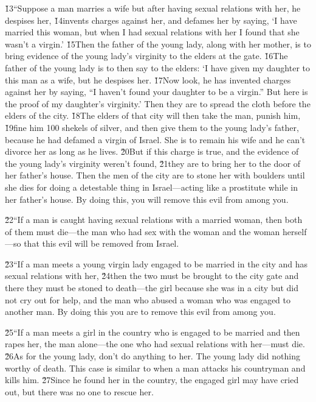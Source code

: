 \v{13}``Suppose a man marries a wife but after having sexual relations with her, he despises her, \v{14}invents charges against her, and defames her by saying, `I have married this woman, but when I had sexual relations with her I found that she wasn't a virgin.' \v{15}Then the father of the young lady, along with her mother, is to bring evidence of the young lady's virginity to the elders at the gate. \v{16}The father of the young lady is to then say to the elders: `I have given my daughter to this man as a wife, but he despises her. \v{17}Now look, he has invented charges against her by saying, ``I haven't found your daughter to be a virgin.'' But here is the proof of my daughter's virginity.' Then they are to spread the cloth before the elders of the city. \v{18}The elders of that city will then take the man, punish him, \v{19}fine him 100 shekels of silver, and then give them to the young lady's father, because he had defamed a virgin of Israel. She is to remain his wife and he can't divorce her as long as he lives. \v{20}But if this charge is true, and the evidence of the young lady's virginity weren't found, \v{21}they are to bring her to the door of her father's house. Then the men of the city are to stone her with boulders until she dies for doing a detestable thing in Israel---acting like a prostitute while in her father's house. By doing this, you will remove this evil from among you.

\v{22}``If a man is caught having sexual relations with a married woman, then both of them must die---the man who had sex with the woman and the woman herself---so that this evil will be removed from Israel.

\v{23}``If a man meets a young virgin lady engaged to be married in the city and has sexual relations with her, \v{24}then the two must be brought to the city gate and there they must be stoned to death---the girl because she was in a city but did not cry out for help, and the man who abused a woman who was engaged to another man. By doing this you are to remove this evil from among you.

\v{25}``If a man meets a girl in the country who is engaged to be married and then rapes her, the man alone---the one who had sexual relations with her---must die. \v{26}As for the young lady, don't do anything to her. The young lady did nothing worthy of death. This case is similar to when a man attacks his countryman and kills him. \v{27}Since he found her in the country, the engaged girl may have cried out, but there was no one to rescue her.


